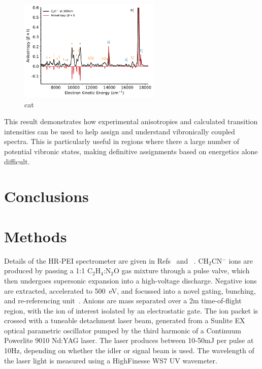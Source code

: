\documentclass[journal=jpcafh,manuscript=article,layout=onecolumn, 12pt]{achemso}
\newcommand{\onlinecite}[1]{\hspace{-1 ex} \nocite{#1}\citenum{#1}}
\begin{document}
\begin{figure}[th!]
	\includegraphics[width=0.6\textwidth]{figures/plotBeta.pdf}
	\caption{cat}
	\label{fig:beta}
\end{figure}

This result demonstrates how experimental anisotropies and calculated transition intensities can be used to help assign and understand vibronically coupled spectra. This is particularly useful in regions where there a large number of potential vibronic states, making definitive assignments based on energetics alone difficult.


 
\section{Conclusions} 

 
\section{Methods}
Details of the HR-PEI spectrometer are given in Refs~\onlinecite{cav07} and~\onlinecite{dev17}. CH$_2$CN$^-$ ions are produced by passing a 1:1 C$_2$H$_4$:N$_2$O gas mixture through a pulse valve, which then undergoes supersonic expansion into a high-voltage discharge. Negative ions are extracted, accelerated to 500~eV, and focussed into a novel gating, bunching, and re-referencing unit~\cite{ded01}. Anions are mass separated over a 2m time-of-flight region, with the ion of interest isolated by an electrostatic gate. The ion packet is crossed with a tuneable detachment laser beam, generated from a Sunlite EX optical parametric oscillator pumped by the third harmonic of a Continuum Powerlite 9010 Nd:YAG laser. The laser produces between 10-50mJ per pulse at 10Hz, depending on whether the idler or signal beam is used. The wavelength of the laser light is measured using a HighFinesse WS7 UV wavemeter.
\end{document}
